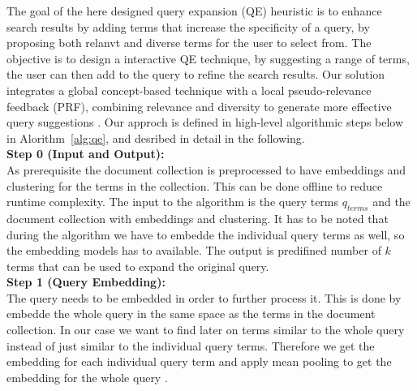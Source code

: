 

The goal of the here designed query expansion (QE) heuristic is to enhance search results by adding terms that increase the specificity of a query, by proposing both relanvt and diverse terms for the user to select from. The objective is to design a interactive QE technique, by suggesting a range of terms, the user can then add to the query to refine the search results.
Our solution integrates a global concept-based technique with a local pseudo-relevance feedback (PRF), combining relevance and diversity to generate more effective query suggestions \cite{azad2019query}. Our approch is defined in high-level algorithmic steps below in Alorithm~\ref{alg:qe}, and desribed in detail in the following.\\

\textbf{Step 0 (Input and Output):}\\
As prerequisite the document collection is preprocessed to have embeddings and clustering for the terms in the collection. This can be done offline to reduce runtime complexity.
The input to the algorithm is the query terms $q_{terms}$ and the document collection with embeddings and clustering. It has to be noted that during the algorithm we have to embedde the individual query terms as well, so the embedding models has to available.
The output is predifined number of $k$ terms that can be used to expand the original query.\\

\textbf{Step 1 (Query Embedding):}\\
The query needs to be embedded in order to further process it. This is done by embedde the whole query in the same space as the terms in the document collection. In our case we want to find later on terms similar to the whole query instead of just similar to the individual query terms. Therefore we get the embedding for each individual query term and apply mean pooling to get the embedding for the whole query \cite{chen2018enhancing}.\\

